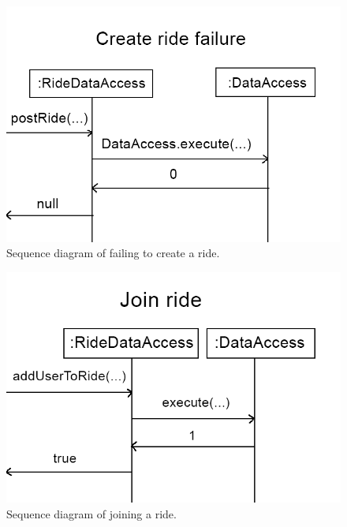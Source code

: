 \documentclass{article}
\begin{document}
\begin{figure}[h]
  \centering
  \includegraphics[scale=0.3]{seqdiagram7.png}
  \caption{Sequence diagram of failing to create a ride.}
  \label{fig:seq7}
\end{figure}

\begin{figure}[h]
  \centering
  \includegraphics[scale=0.3]{seqdiagram8.png}
  \caption{Sequence diagram of joining a ride.}
  \label{fig:seq8}
\end{figure}
\end{document}
